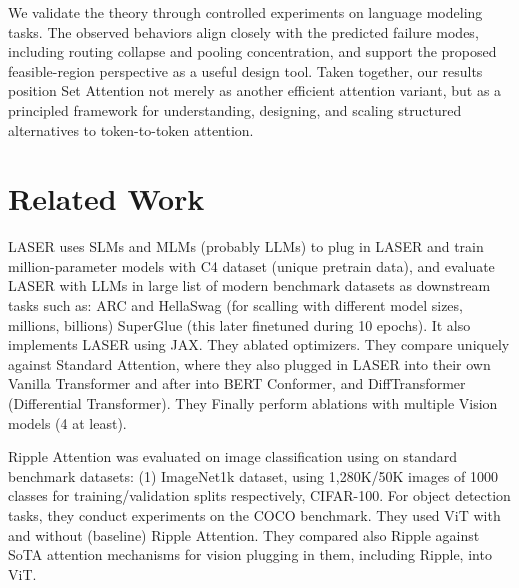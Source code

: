 \documentclass{article}
\theoremstyle{plain}
\theoremstyle{definition}
\theoremstyle{remark}
\begin{document}
We validate the theory through controlled experiments on language modeling tasks. The observed behaviors align closely with the predicted failure modes, including routing collapse and pooling concentration, and support the proposed feasible-region perspective as a useful design tool. Taken together, our results position Set Attention not merely as another efficient attention variant, but as a principled framework for understanding, designing, and scaling structured alternatives to token-to-token attention.

\section{Related Work}
LASER uses SLMs and MLMs (probably LLMs) to plug in LASER and train million-parameter models with C4 dataset (unique pretrain data), and evaluate LASER with LLMs in large list of modern benchmark datasets as downstream tasks such as: ARC and HellaSwag (for scalling with different model sizes, millions, billions) SuperGlue (this later finetuned during 10 epochs).  It also implements LASER using JAX. They ablated optimizers. They compare uniquely against Standard Attention, where they also plugged in LASER into their own Vanilla Transformer and after into BERT Conformer, and DiffTransformer (Differential Transformer). They Finally perform ablations with multiple Vision models (4 at least). %

Ripple Attention was evaluated on image classification using
on standard benchmark datasets: (1) ImageNet1k dataset, using 1,280K/50K images of 1000 classes for training/validation splits respectively, CIFAR-100. For object detection tasks, they conduct experiments on the COCO benchmark. They used ViT with and without (baseline) Ripple Attention. They compared also Ripple against SoTA attention mechanisms for vision plugging in them, including Ripple, into ViT.  %
\end{document}
